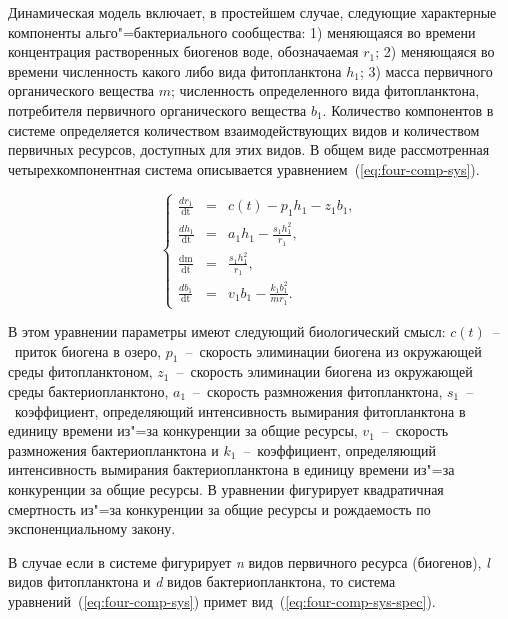\documentclass[a4paper,12pt,openany,final]{extreport}
\begin{document}
Динамическая модель включает, в простейшем случае, следующие характерные компоненты альго"=бактериального сообщества: 1) меняющаяся во времени концентрация растворенных биогенов воде, обозначаемая \(r_1\); 2) меняющаяся во времени численность какого либо вида фитопланктона \(h_{1}\); 3) масса первичного органического вещества \(m\); численность определенного вида фитопланктона, потребителя первичного органического вещества \(b_1\). Количество компонентов в системе определяется количеством взаимодействующих видов и количеством первичных ресурсов, доступных для этих видов. В общем виде рассмотренная четырехкомпонентная система описывается уравнением~(\ref{eq:four-comp-sys}).

\begin{equation}
\left\{ \begin{array}{lcl}
\frac{dr_{1}}{\text{dt}} &=& c\left( t \right) - p_{1}h_{1} - z_{1}b_{1},\\
\frac{dh_{1}}{\text{dt}} &=& a_{1}h_{1} - \frac{s_{1}h_{1}^{2}}{r_{1}},\\
\frac{\text{dm}}{\text{dt}} &=& \frac{s_{1}h_{1}^{2}}{r_{1}},\\
\frac{db_{1}}{\text{dt}} &=& v_{1}b_{1} - \frac{k_{1}b_{1}^{2}}{mr_{1}}.
\end{array} \right. \label{eq:four-comp-sys}
\end{equation}

В этом уравнении параметры имеют следующий биологический смысл: \(c(t)\)~--~приток биогена в озеро, \(p_{1}\)~--~скорость элиминации биогена из окружающей среды фитопланктоном, \(z_{1}\)~--~скорость элиминации биогена из окружающей среды бактериопланктоно, \(a_{1}\)~--~скорость размножения фитопланктона, \(s_{1}\)~--~коэффициент, определяющий интенсивность вымирания фитопланктона в единицу времени из"=за конкуренции за общие ресурсы, \(v_1\)~--~скорость размножения бактериопланктона и \(k_{1}\)~--~коэффициент, определяющий интенсивность вымирания бактериопланктона в единицу времени из"=за конкуренции за общие ресурсы.  В уравнении фигурирует квадратичная смертность из"=за конкуренции за общие ресурсы и рождаемость по экспоненциальному закону.

В случае если в системе фигурирует \emph{n} видов первичного ресурса (биогенов), \emph{l} видов фитопланктона и \emph{d} видов бактериопланктона, то система уравнений~(\ref{eq:four-comp-sys}) примет вид~(\ref{eq:four-comp-sys-spec}).
\end{document}

